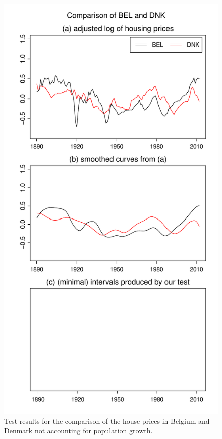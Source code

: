 \documentclass[a4paper,12pt]{article}
\begin{document}
\begin{enumerate}[label=\arabic*.,leftmargin=0.6cm]
\begin{figure}[t!]
\begin{minipage}[t]{0.48\textwidth}
\includegraphics[width=\textwidth]{output/BEL_vs_DNK}
\caption{Test results for the comparison of the house prices in Belgium and Denmark not accounting for population growth.}\label{fig:hp:Belgium:Denmark}
\end{minipage}

\end{figure}
\end{enumerate}
\end{document}
